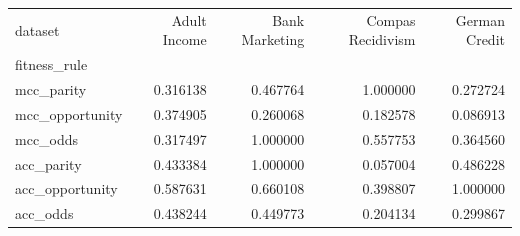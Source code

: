 \begin{tabular}{lrrrr}
\toprule
dataset & Adult Income & Bank Marketing & Compas Recidivism & German Credit \\
fitness_rule &  &  &  &  \\
\midrule
mcc_parity & 0.316138 & 0.467764 & 1.000000 & 0.272724 \\
mcc_opportunity & 0.374905 & 0.260068 & 0.182578 & 0.086913 \\
mcc_odds & 0.317497 & 1.000000 & 0.557753 & 0.364560 \\
acc_parity & 0.433384 & 1.000000 & 0.057004 & 0.486228 \\
acc_opportunity & 0.587631 & 0.660108 & 0.398807 & 1.000000 \\
acc_odds & 0.438244 & 0.449773 & 0.204134 & 0.299867 \\
\bottomrule
\end{tabular}
